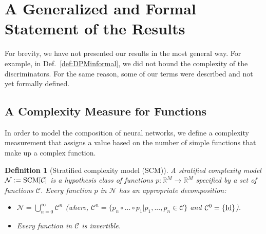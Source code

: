 \documentclass{article} %
\newtheorem{defn}{Definition}
\newcommand{\Id}{\textnormal{Id}}
\begin{document}
\FloatBarrier
\newpage

\appendix


\section{A Generalized and Formal Statement of the Results}
\label{sec:extended}

For brevity, we have not presented our results in the most general way. For example, in Def.~\ref{def:DPMinformal}, we did not bound the complexity of the discriminators. For the same reason, some of our terms were described and not yet formally defined.

\subsection{A Complexity Measure for Functions}\label{sec:complexMeasure2}

In order to model the composition of neural networks, we define a complexity measurement that assigns a value based on the number of simple functions that make up a complex function. 

\begin{defn}[Stratified complexity model (SCM)]\label{def:SCM} A stratified complexity model $\mathcal{N} := \textnormal{SCM}[\mathcal{C}]$ is a hypothesis class  of functions $p:\mathbb{R}^M \rightarrow \mathbb{R}^M$ specified by a set of functions $\mathcal{C}$. Every function $p$ in $\mathcal{N}$ has an appropriate decomposition:
\begin{itemize}
\item $\mathcal{N} = \bigcup^{\infty}_{n=0} \mathcal{C}^n$ (where, $ \mathcal{C}^n = \{p_n \circ ... \circ p_1 \vert p_1,...,p_n \in \mathcal{C}\}$  and $\mathcal{C}^0 = \{\Id\}$).
\item Every function in $\mathcal{C}$ is invertible.
\end{itemize}
\end{defn}
\end{document}
